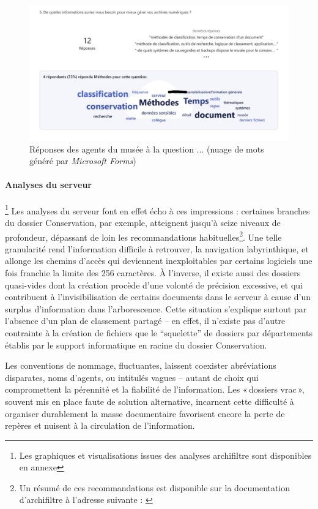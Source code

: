 \begin{figure}
	\centering
	\includegraphics[width=0.7\linewidth]{img/IMG_questionnaire_attentes}
	\caption[Attentes des agents du \mae~en matière de gestion des archives]{Réponses des agents du musée à la question ... (nuage de mots généré par \textit{Microsoft Forms})}
	\label{fig:imgquestionnaireattentes}
\end{figure}

\paragraph*{Analyses du serveur}\footnote{Les graphiques et visualisations issues des analyses \gls{archifiltre} sont disponibles en annexe }
Les analyses du serveur font en effet écho à ces impressions : certaines branches du dossier Conservation, par exemple, atteignent jusqu’à seize niveaux de profondeur, dépassant de loin les recommandations habituelles\footnote{Un résumé de ces recommandations est disponible sur la documentation d'\gls{archifiltre} à l'adresse suivante : \cite{WikiArchifiltre}}. Une telle granularité rend l’information difficile à retrouver, la navigation labyrinthique, et allonge les chemins d’accès qui deviennent inexploitables par certains logiciels une fois franchie la limite des 256 caractères. À l’inverse, il existe aussi des dossiers quasi-vides dont la création procède d’une volonté de précision excessive, et qui contribuent à l'invisibilisation de certains documents dans le serveur à cause d'un surplus d'information dans l'arborescence. Cette situation s'explique surtout par l'absence d'un plan de classement partagé -- en effet, il n'existe pas d'autre contrainte à la création de fichiers que le \enquote{squelette} de dossiers par départements établis par le support informatique en racine du dossier Conservation.

Les conventions de nommage, fluctuantes, laissent coexister abréviations disparates, noms d’agents, ou intitulés vagues – autant de choix qui compromettent la pérennité et la fiabilité de l’information. Les « dossiers vrac », souvent mis en place faute de solution alternative, incarnent cette difficulté à organiser durablement la masse documentaire favorisent encore la perte de repères et nuisent à la circulation de l’information.


